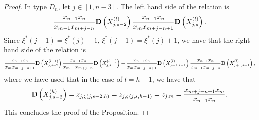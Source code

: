 \documentclass[12pt]{amsart}
\theoremstyle{plain}
\theoremstyle{definition}
\numberwithin{equation}{section}
\newcommand\scalemath[2]{\scalebox{#1}{\mbox{\ensuremath{\displaystyle #2}}}}
\newcommand{\CQ}{\mathcal{C}_Q}
\begin{document}
\begin{proof}
In type $D_n$, let $j \in [1,n-3]$. The left hand side of the relation is
\begin{align*}
\frac{x_{n-1}x_n}{x_{m-1}x_{m+j-n}} {\bf D}\left( X_{j,s-2}^{(l)} \right) \frac{x_{n-1}x_n}{x_{m}x_{m+j-n+1}} {\bf D}\left( X_{j,s}^{(l)} \right). 
\end{align*}
Since $\xi^*(j-1) = \xi^*(j)-1$, $\xi^*(j+1) = \xi^*(j)+1$, we have that the right hand side of the relation is 
\begin{align*}
\scalemath{0.86}{
\frac{x_{n-1}x_n}{x_{m}x_{m+j-n+1}} {\bf D}\left( X_{j,s-2}^{(l+1)} \right) \frac{x_{n-1}x_n}{x_{m-1}x_{m+j-n}} {\bf D}\left( X_{j,s}^{(l-1)} \right) + \frac{x_{n-1}x_n}{x_{m}x_{m+j-n+1}}  {\bf D}\left( X_{j-1,s-1}^{(l)} \right) \frac{x_{n-1}x_n}{x_{m-1}x_{m+j-n}} {\bf D}\left( X_{j+1,s-1}^{(l)} \right),}
\end{align*}
where we have used that in the case of $l=h-1$, we have that 
\begin{align*}
{\bf D}\left( X_{j,s-2}^{(h)} \right) = z_{j,\zeta(j,s-2,h)} = z_{j,\zeta(j,s,h-1)} = z_{j,m} = \frac{x_{m+j-n+1}x_m}{x_{n-1}x_n}.
\end{align*}
This concludes the proof of the Proposition.
\end{proof}

 
\end{document}
